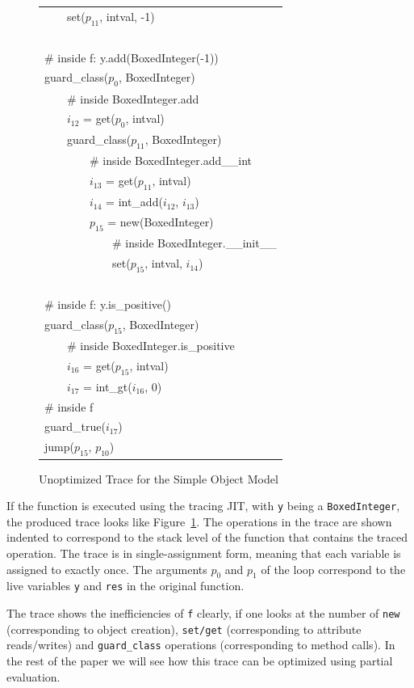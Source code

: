 \documentclass{sigplanconf}
\begin{document}
\begin{figure}
{\begin{tabular}{l}
~~~~set($p_{11}$, intval, -1) \\
~\\
\# inside f: y.add(BoxedInteger(-1)) \\
guard\_class($p_{0}$, BoxedInteger) \\
~~~~\# inside BoxedInteger.add \\
~~~~$i_{12}$ = get($p_{0}$, intval) \\
~~~~guard\_class($p_{11}$, BoxedInteger) \\
~~~~~~~~\# inside BoxedInteger.add\_\_int \\
~~~~~~~~$i_{13}$ = get($p_{11}$, intval) \\
~~~~~~~~$i_{14}$ = int\_add($i_{12}$, $i_{13}$) \\
~~~~~~~~$p_{15}$ = new(BoxedInteger) \\
~~~~~~~~~~~~\# inside BoxedInteger.\_\_init\_\_ \\
~~~~~~~~~~~~set($p_{15}$, intval, $i_{14}$) \\
~\\
\# inside f: y.is\_positive() \\
guard\_class($p_{15}$, BoxedInteger) \\
~~~~\# inside BoxedInteger.is\_positive \\
~~~~$i_{16}$ = get($p_{15}$, intval) \\
~~~~$i_{17}$ = int\_gt($i_{16}$, 0) \\
\# inside f \\
guard\_true($i_{17}$) \\
jump($p_{15}$, $p_{10}$) \\
\end{tabular}
}
\caption{Unoptimized Trace for the Simple Object Model}
\label{fig:unopt-trace}
\end{figure}

If the function is executed using the tracing JIT, with \texttt{y} being a
\texttt{BoxedInteger}, the produced trace looks like
Figure~\ref{fig:unopt-trace}. The operations in the trace are shown indented to
correspond to the stack level of the function that contains the traced
operation. The trace is in single-assignment form, meaning that each variable is
assigned to exactly once. The arguments $p_0$ and $p_1$ of the loop correspond
to the live variables \texttt{y} and \texttt{res} in the original function.

The trace shows the inefficiencies of \texttt{f} clearly, if one
looks at the number of \texttt{new} (corresponding to object creation),
\texttt{set/get} (corresponding to attribute reads/writes) and
\texttt{guard\_class} operations (corresponding to method calls).
In the rest of the paper we will see how this trace can be optimized using
partial evaluation.
\end{document}

